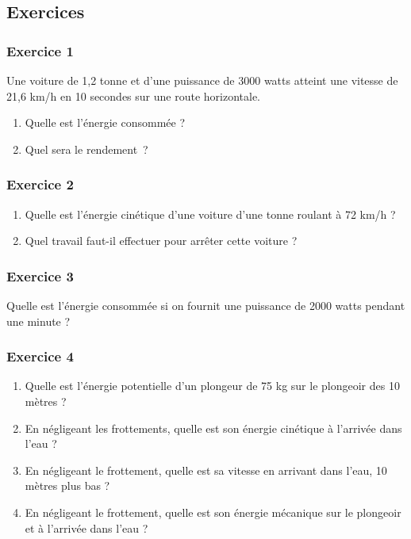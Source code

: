 \subsection{Exercices}

\subsubsection*{Exercice 1}

Une voiture de 1,2 tonne et d'une puissance de 3000 watts atteint une
vitesse de 21,6 km/h en 10 secondes sur une route horizontale.
\begin{enumerate}
  \item   Quelle est l'énergie consommée ?
  \item   Quel sera le rendement~?
\end{enumerate}

\subsubsection*{Exercice 2}
\begin{enumerate}
  \item Quelle est l'énergie cinétique d'une voiture d'une tonne roulant à 72
km/h ?
   \item Quel travail faut-il effectuer pour arrêter cette voiture ?
\end{enumerate}

\subsubsection*{Exercice 3 }

Quelle est l'énergie consommée si on fournit une puissance de 2000 watts
pendant une minute ?

\subsubsection*{Exercice 4}

\begin{enumerate}
\item   Quelle est l'énergie potentielle d'un plongeur de 75 kg sur le
  plongeoir des 10 mètres ?
\item   En négligeant les frottements, quelle est son énergie cinétique à
  l'arrivée dans l'eau ?
\item   En négligeant le frottement, quelle est sa vitesse en arrivant dans
  l'eau, 10 mètres plus bas ?
\item   En négligeant le frottement, quelle est son énergie mécanique sur le
  plongeoir et à l'arrivée dans l'eau ?
\end{enumerate}

